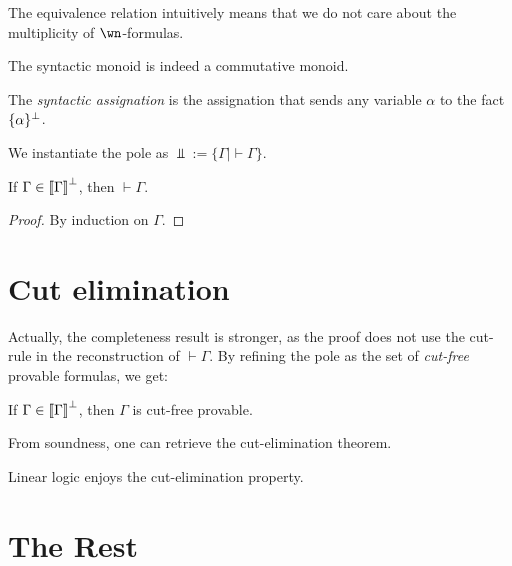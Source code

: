 The equivalence relation intuitively means that we do not care about the
multiplicity of \(\wn\)-formulas.

\begin{lemma}
The syntactic monoid is indeed a commutative monoid.
\end{lemma}

\begin{definition}
The \emph{syntactic assignation} is the assignation that sends any variable $\alpha$ to the fact $\{\alpha\}^\bot$.
\end{definition}

We instantiate the pole as \(\Bot := \{\Gamma \mid \vdash\Gamma\}\).

\begin{theorem}
If $\Gamma\in\left\llbracket \Gamma\right\rrbracket^\bot$, then $\vdash\Gamma$.
\end{theorem}

\begin{proof}
By induction on $\Gamma$.
\end{proof}

\section{Cut elimination}\label{cut-elimination}

Actually, the completeness result is stronger, as the proof does not use
the cut-rule in the reconstruction of \(\vdash\Gamma\). By refining the
pole as the set of \emph{cut-free} provable formulas, we get:

\begin{theorem}
If $\Gamma\in\left\llbracket \Gamma\right\rrbracket^\bot$, then $\Gamma$ is cut-free provable.
\end{theorem}

From soundness, one can retrieve the cut-elimination theorem.

\begin{corollary}
Linear logic enjoys the cut-elimination property.
\end{corollary}

\section{The Rest}\label{the-rest}



